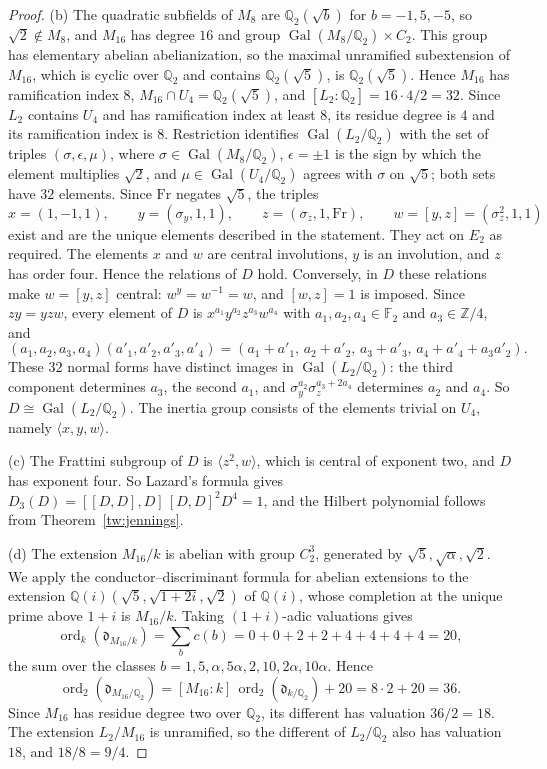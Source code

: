 \documentclass[11pt]{amsart}
\numberwithin{equation}{section}
\theoremstyle{definition}
\theoremstyle{remark}
\DeclareMathOperator{\Gal}{Gal}
\newcommand{\Ftwo}{\mathbb F_2}
\newcommand{\Q}{\mathbb Q}
\newcommand{\Z}{\mathbb Z}
\begin{document}
\begin{proof}
(b) The quadratic subfields of $M_8$ are $\Q_2(\sqrt b)$ for $b=-1,5,-5$, so
$\sqrt2\notin M_8$, and $M_{16}$ has degree $16$ and group
$\Gal(M_8/\Q_2)\times C_2$. This group has elementary abelian
abelianization, so the maximal unramified subextension of $M_{16}$, which is
cyclic over $\Q_2$ and contains $\Q_2(\sqrt5)$, is $\Q_2(\sqrt5)$. Hence
$M_{16}$ has ramification index $8$, $M_{16}\cap U_4=\Q_2(\sqrt5)$, and
$[L_2:\Q_2]=16\cdot4/2=32$. Since $L_2$ contains $U_4$ and has ramification
index at least $8$, its residue degree is $4$ and its ramification index is
$8$. Restriction identifies $\Gal(L_2/\Q_2)$ with the set of triples
$(\sigma,\epsilon,\mu)$, where $\sigma\in\Gal(M_8/\Q_2)$, $\epsilon=\pm1$ is
the sign by which the element multiplies $\sqrt2$, and $\mu\in\Gal(U_4/\Q_2)$
agrees with $\sigma$ on $\sqrt5$; both sets have $32$ elements. Since $\mathrm{Fr}$
negates $\sqrt5$, the triples
\[
 x=(1,-1,1),\qquad y=(\sigma_y,1,1),\qquad z=(\sigma_z,1,\mathrm{Fr}),\qquad
 w=[y,z]=(\sigma_z^2,1,1)
\]
exist and are the unique elements described in the statement. They act on
$E_2$ as required. The elements $x$ and $w$ are central involutions, $y$ is
an involution, and $z$ has order four. Hence the relations of $D$ hold. Conversely, in
$D$ these relations make $w=[y,z]$ central: $w^y=w^{-1}=w$, and $[w,z]=1$ is
imposed. Since $zy=yzw$, every element of $D$ is
$x^{a_1}y^{a_2}z^{a_3}w^{a_4}$ with $a_1,a_2,a_4\in\Ftwo$ and
$a_3\in\Z/4$, and
\[
 (a_1,a_2,a_3,a_4)(a'_1,a'_2,a'_3,a'_4)
 =(a_1+a'_1,\,a_2+a'_2,\,a_3+a'_3,\,a_4+a'_4+a_3a'_2).
\]
These $32$ normal forms have distinct images in $\Gal(L_2/\Q_2)$: the third
component determines $a_3$, the second $a_1$, and
$\sigma_y^{a_2}\sigma_z^{a_3+2a_4}$ determines $a_2$ and $a_4$. So
$D\cong\Gal(L_2/\Q_2)$. The inertia group consists of the elements trivial
on $U_4$, namely $\langle x,y,w\rangle$.

(c) The Frattini subgroup of $D$ is $\langle z^2,w\rangle$, which is central
of exponent two, and $D$ has exponent four. So Lazard's formula gives
$D_3(D)=[[D,D],D]\,[D,D]^2D^4=1$, and the Hilbert polynomial follows from
Theorem~\ref{tw:jennings}.

(d) The extension $M_{16}/k$ is abelian with group $C_2^3$, generated by
$\sqrt5,\sqrt\alpha,\sqrt2$. We apply the conductor--discriminant formula for
abelian extensions \cite[Chapter~V, Theorem~3.27]{MilneCFT} to the extension
$\Q(i)(\sqrt5,\sqrt{1+2i},\sqrt2)$ of $\Q(i)$, whose completion at the unique
prime above $1+i$ is $M_{16}/k$. Taking $(1+i)$-adic valuations gives
\[
 \operatorname{ord}_k(\mathfrak d_{M_{16}/k})=\sum_bc(b)=0+0+2+2+4+4+4+4=20,
\]
the sum over the classes $b=1,5,\alpha,5\alpha,2,10,2\alpha,10\alpha$. Hence
\[
 \operatorname{ord}_2(\mathfrak d_{M_{16}/\Q_2})
 =[M_{16}:k]\,\operatorname{ord}_2(\mathfrak d_{k/\Q_2})+20=8\cdot2+20=36.
\]
Since $M_{16}$ has residue degree two over $\Q_2$, its different has
valuation $36/2=18$. The extension $L_2/M_{16}$ is unramified, so the
different of $L_2/\Q_2$ also has valuation $18$, and $18/8=9/4$.
\end{proof}
\end{document}
